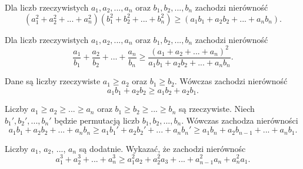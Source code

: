 



\noindent
Dla liczb rzeczywistych $a_1, a_2, ..., a_n$ oraz $b_1, b_2, ..., b_n$ zachodzi nierówność
\[
	\left(a_1^2 + a_2^2 + ... + a_n^2\right)\left(b_1^2 + b_2^2 + ... + b_n^2\right) \geqslant \left(a_1b_1 + a_2b_2 + ... + a_nb_n\right).
\]





\noindent
Dla liczb rzeczywistych $a_1, a_2, ..., a_n$ oraz $b_1, b_2, ..., b_n$ zachodzi nierówność
\[
	\frac{a_1}{b_1} + \frac{a_2}{b_2} + ... + \frac{a_n}{b_n} \geqslant \frac{\left(a_1 + a_2 + ... + a_n\right)^2}{a_1b_1 + a_2b_2 + ... + a_nb_n}.
\]





\noindent
Dane są liczby rzeczywiste $a_1 \geqslant a_2$ oraz $b_1 \geqslant b_2$. Wówczas zachodzi nierówność
\[
	a_1b_1 + a_2b_2 \geqslant a_1b_2 + a_2b_1.
\] 





\noindent
Liczby $a_1 \geqslant a_2 \geqslant ... \geqslant a_n$ oraz $b_1 \geqslant b_2 \geqslant ... \geqslant b_n$ są rzeczywiste. Niech $b_1', b_2', ..., b_n'$ będzie permutacją liczb $b_1, b_2, ..., b_n$. Wówczas zachodza nierówności
\[
	a_1b_1 + a_2b_2 + ... + a_nb_n \geqslant a_1b_1' + a_2b_2' + ... + a_nb_n' \geqslant a_1b_n + a_2b_{n - 1} + ... + a_nb_1.
\]





\noindent
Liczby $a_1$, $a_2$, ..., $a_n$ są dodatnie. Wykazać, że zachodzi nierównośc
\[
	a_1^3 + a_2^3 + ... + a_n^3 \geqslant a_1^2a_2 + a_2^2a_3 + ... + a^2_{n - 1}a_n + a_n^2a_1.
\]



